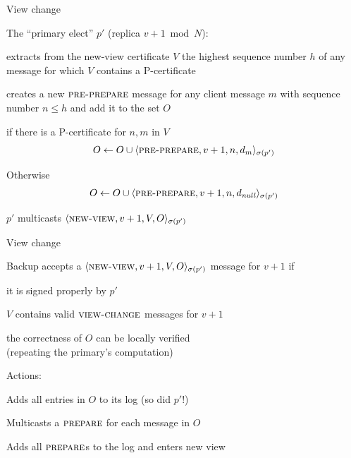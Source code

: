 \begin{frame}{View change}
	
The “\alert{primary elect}” $p'$ (replica $v+1 \bmod N$):
\BIL
\item extracts from the new-view certificate $V$ the highest sequence number $h$ of any message for which $V$ contains a P-certificate
\item creates a new $\textsc{pre-prepare}$ message  for any client message $m$ with sequence number $n \leq h$ and add it to the set $O$
	\BI
	\item if there is a P-certificate for $n,m$ in $V$
	\[
	O \gets O \cup \langle \textsc{pre-prepare}, v+1, n, d_m \rangle_{\sigma(p')}
	\]
	\item Otherwise
	\[
	O \gets O \cup \langle \textsc{pre-prepare}, v+1, n, d_{\mathit{null}} \rangle_{\sigma(p')}
	\]
	\EI
\item $p'$ multicasts $\langle \textsc{new-view}, v+1, V, O \rangle_{\sigma(p')}$
\EIL

\end{frame}

\begin{frame}{View change}
\BIL
\item Backup accepts a $\langle \textsc{new-view}, v+1, V, O \rangle_{\sigma(p')}$ message for $v+1$ if
	\BI
	\item it is signed properly by $p'$
	\item $V$ contains valid $\textsc{view-change}$ messages for $v+1$
	\item the correctness of $O$ can be locally verified \\
			(repeating the primary's computation)
	\EI
\item Actions:
	\BI
	\item Adds all entries in $O$ to its log (so did $p'$!) 
	\item Multicasts a $\textsc{prepare}$ for each message in $O$
	\item Adds all $\textsc{prepare}$s to the log and enters new view
	\EI
\EIL
\end{frame}

